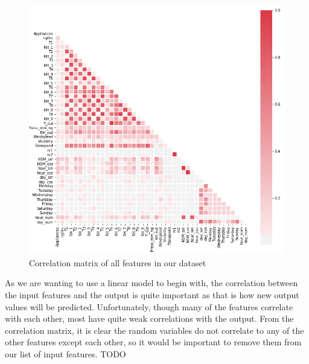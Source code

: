 \documentclass{article}
\begin{document}
\begin{figure}[H]
\centering
\includegraphics[width=1\textwidth, keepaspectratio]{imgs/all-corr.png}
\caption{Correlation matrix of all features in our dataset}
\end{figure}
\noindent
As we are wanting to use a linear model to begin with, the correlation between the input features and the output is quite important as that is how new output values will be predicted. Unfortunately, though many of the features correlate with each other, most have quite weak correlations with the output. From the correlation matrix, it is clear the random variables do not correlate to any of the other features except each other, so it would be important to remove them from our list of input features.  TODO
\end{document}
